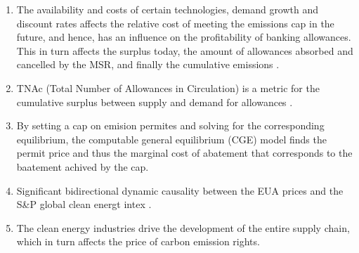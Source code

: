 \begin{enumerate}[wide, itemsep=0cm, topsep=0cm, label=\textbf{\arabic{enumi}.}]
 	\item The availability and costs of certain technologies, demand growth and discount rates affects the relative cost of meeting the emissions cap in the future, and hence, has an influence on  the profitability of banking allowances. This in turn affects the surplus today, the amount of allowances absorbed and cancelled by the MSR, and finally the cumulative emissions \cite{bruninx2020long}.
 	\item TNAc (Total Number of Allowances in Circulation) is a metric for the cumulative surplus between supply and demand for allowances \cite{perino2017eu, bruninx2020long}.
 	\item By setting a cap on emision permites and solving for the corresponding equilibrium, the computable general equilibrium (CGE) model finds the permit price and thus the marginal cost of abatement that corresponds to the baatement achived by the cap. \cite{landis2015final}
 	
 	\item Significant bidirectional dynamic causality between the EUA prices and the S\&P global clean energt intex \cite{lu2022transmission}.
 	\item The clean energy industries drive the development of the entire supply chain, which in turn affects the price of carbon emission rights.
\end{enumerate} 